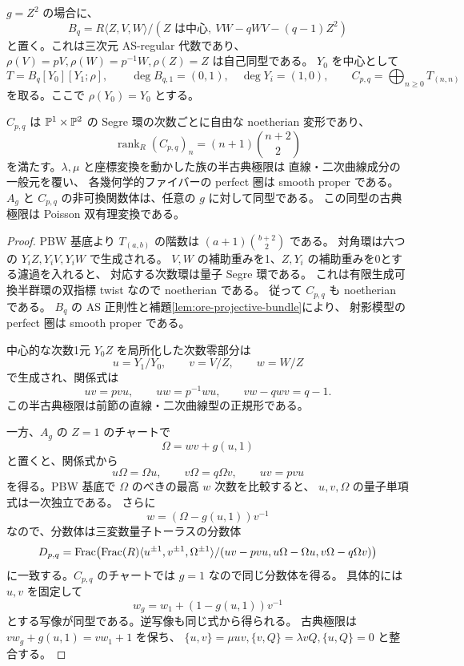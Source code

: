 $g=Z^2$ の場合に、
\[
 B_q=R\langle Z,V,W\rangle/
       (Z\text{ は中心},\ VW-qWV-(q-1)Z^2)
\]
と置く。これは三次元 AS-regular 代数であり、
$\rho(V)=pV,\rho(W)=p^{-1}W,\rho(Z)=Z$ は自己同型である。
$Y_0$ を中心として
\[
 T=B_q[Y_0][Y_1;\rho],\qquad
 \deg B_{q,1}=(0,1),\quad\deg Y_i=(1,0),\qquad
 C_{p,q}=\bigoplus_{n\ge0}T_{(n,n)}
\]
を取る。ここで $\rho(Y_0)=Y_0$ とする。

\begin{proposition}\label{prop:projective-line-conic-link}
$C_{p,q}$ は $\mathbb P^1\times\mathbb P^2$ の Segre 環の次数ごとに自由な
noetherian 変形であり、
\[
 \operatorname{rank}_R(C_{p,q})_n=(n+1)\binom{n+2}{2}
\]
を満たす。$\lambda,\mu$ と座標変換を動かした族の半古典極限は
直線・二次曲線成分の一般元を覆い、
各幾何学的ファイバーの perfect 圏は smooth proper である。
$A_g$ と $C_{p,q}$ の非可換関数体は、任意の $g$ に対して同型である。
この同型の古典極限は Poisson 双有理変換である。
\end{proposition}
\begin{proof}
PBW 基底より $T_{(a,b)}$ の階数は $(a+1)\binom{b+2}{2}$ である。
対角環は六つの $Y_iZ,Y_iV,Y_iW$ で生成される。
$V,W$ の補助重みを1、$Z,Y_i$ の補助重みを0とする濾過を入れると、
対応する次数環は量子 Segre 環である。
これは有限生成可換半群環の双指標 twist なので noetherian である。
従って $C_{p,q}$ も noetherian である。
$B_q$ の AS 正則性と補題\ref{lem:ore-projective-bundle}により、
射影模型の perfect 圏は smooth proper である。

中心的な次数1元 $Y_0Z$ を局所化した次数零部分は
\[
 u=Y_1/Y_0,\qquad v=V/Z,\qquad w=W/Z
\]
で生成され、関係式は
\[
 uv=pvu,\qquad uw=p^{-1}wu,\qquad
 vw-qwv=q-1.
\]
この半古典極限は前節の直線・二次曲線型の正規形である。

一方、$A_g$ の $Z=1$ のチャートで
\[
 \Omega=wv+g(u,1)
\]
と置くと、関係式から
\[
 u\Omega=\Omega u,\qquad v\Omega=q\Omega v,
 \qquad uv=pvu
\]
を得る。PBW 基底で $\Omega$ のべきの最高 $w$ 次数を比較すると、
$u,v,\Omega$ の量子単項式は一次独立である。
さらに
\[
 w=(\Omega-g(u,1))v^{-1}
\]
なので、分数体は三変数量子トーラスの分数体
\[
 D_{p,q}=
 \operatorname{Frac}\bigl(\operatorname{Frac}(R)
 \langle u^{\pm1},v^{\pm1},\Omega^{\pm1}\rangle/
 (uv-pvu,u\Omega-\Omega u,v\Omega-q\Omega v)\bigr)
\]
に一致する。$C_{p,q}$ のチャートでは $g=1$ なので同じ分数体を得る。
具体的には $u,v$ を固定して
\[
 w_g=w_1+(1-g(u,1))v^{-1}
\]
とする写像が同型である。逆写像も同じ式から得られる。
古典極限は $vw_g+g(u,1)=vw_1+1$ を保ち、
$\{u,v\}=\mu uv,\{v,Q\}=\lambda vQ,\{u,Q\}=0$ と整合する。
\end{proof}

